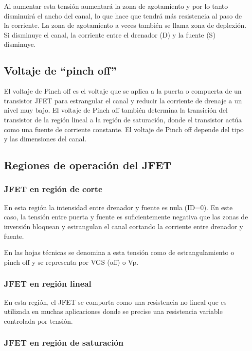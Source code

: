 \documentclass[12pt, a4paper]{article}
\begin{document}
    Al aumentar esta tensión aumentará la zona de agotamiento y por lo tanto disminuirá el ancho del canal, lo que hace que tendrá más resistencia al paso de la corriente. La zona de agotamiento a veces también se llama zona de deplexión. Si disminuye el canal, la corriente entre el drenador (D) y la fuente (S) disminuye.

    \subsection{Voltaje de “pinch off” }

    El voltaje de Pinch off es el voltaje que se aplica a la puerta o compuerta de un transistor JFET para estrangular el canal y reducir la corriente de drenaje a un nivel muy bajo. El voltaje de Pinch off también determina la transición del transistor de la región lineal a la región de saturación, donde el transistor actúa como una fuente de corriente constante. El voltaje de Pinch off depende del tipo y las dimensiones del canal.

    \subsection{Regiones de operación del JFET}

    \subsubsection{JFET en región de corte}

    En esta región la intensidad entre drenador y fuente es nula (ID=0). En este caso, la tensión entre puerta y fuente es suficientemente negativa que las zonas de inversión bloquean y estrangulan el canal cortando la corriente entre drenador y fuente.

    En las hojas técnicas se denomina a esta tensión como de estrangulamiento o pinch-off y se representa por VGS (off) o Vp.

    \subsubsection{JFET en región lineal}

    En esta región, el JFET se comporta como una resistencia no lineal que es utilizada en muchas aplicaciones donde se precise una resistencia variable controlada por tensión.

    \subsubsection{JFET en región de saturación}
\end{document}
